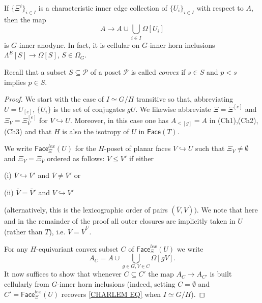 \documentclass[a4paper,10pt
]{article}%
\begin{document}
\begin{lemma}\label{CHAREDGE LEM}
If $\{\Xi^i\}_{i \in I}$ is a characteristic inner edge collection of $\{U_i\}_{i\in I}$ with respect to $A$, then the map
	\begin{equation}\label{CHARLEM EQ}
		A \to A \cup \bigcup_{i \in I} \Omega[U_i]
	\end{equation}
is $G$-inner anodyne. In fact, it is cellular on $G$-inner horn inclusions $\Lambda^E[S] \to \Omega[S]$, $S \in \Omega_G$.
\end{lemma}

Recall that a subset $S \subseteq \mathcal{P}$ of a poset $\mathcal{P}$ is called \textit{convex} if $s \in S$ and 
$p<s$ implies $p \in S$.

\begin{proof}
We start with the case of $I \simeq G/H$ transitive so that, abbreviating $U = U_{[e]}$, $\{U_i\}$ is the set of conjugates $gU$. 
We likewise abbreviate $\Xi = \Xi^{[e]}$ and
$\Xi_V = \Xi_V^{[e]}$ for $V \hookrightarrow U$.
Moreover, in this case one has $A_{<[g]}=A$ in (Ch1),(Ch2),(Ch3) and that $H$ is also the isotropy of $U$ in $\mathsf{Face}(T)$.

We write $\mathsf{Face}_{\Xi}^{lex}(U)$
for the $H$-poset of planar faces $V \hookrightarrow U$
such that $\Xi_V \neq \emptyset$ and $\Xi_V = \Xi_{\bar{V}}$
ordered as follows: 
$V \leq V'$ if either
	\begin{inparaenum}
		\item[(i)] $\bar{V} \hookrightarrow \bar{V}'$ and 
		$\bar{V} \neq \bar{V}'$ or
		\item[(ii)] $\bar{V} = \bar{V}'$ and
		$V \hookrightarrow V'$
	\end{inparaenum}
(alternatively, this is the lexicographic order of pairs $(\bar{V},V))$.
We note that here and in the remainder of the proof all outer closures are implicitly taken in $U$ (rather than $T$), i.e. 
$\bar{V}=\bar{V}^U$.

For any $H$-equivariant convex subset $C$ of $\mathsf{Face}_{\Xi}^{lex}(U)$ we write
\[
A_C = 
A \cup \bigcup_{g\in G,V \in C} \Omega[gV].
\]
It now suffices to show that whenever
$C \subseteq C'$
the map 
$A_C \to A_{C'}$ is built cellularly from 
$G$-inner horn inclusions
(indeed, setting $C=\emptyset$ and 
$C'=\mathsf{Face}_{\Xi}^{lex}(U)$ recovers \eqref{CHARLEM EQ}
when $I \simeq G/H$).


\end{proof}
\end{document}
